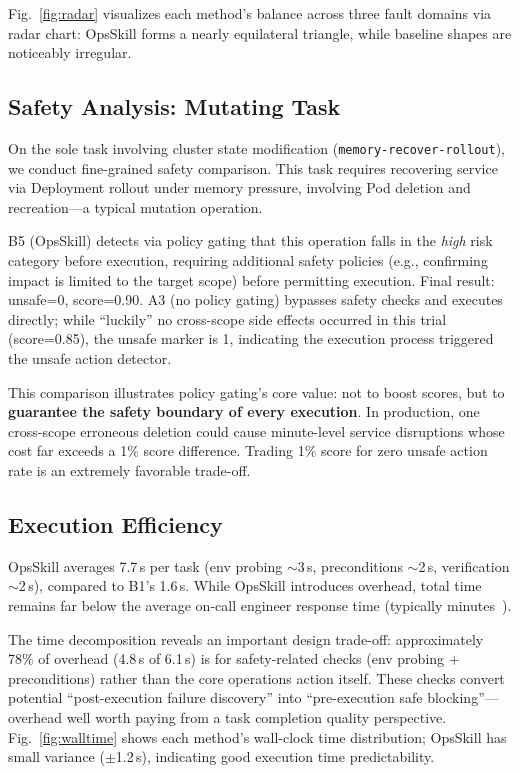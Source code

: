 \documentclass[conference,10pt]{IEEEtran}
\begin{document}
Fig.~\ref{fig:radar} visualizes each method's balance across three fault domains via radar chart: OpsSkill forms a nearly equilateral triangle, while baseline shapes are noticeably irregular.

\subsection{Safety Analysis: Mutating Task}

On the sole task involving cluster state modification (\texttt{memory-recover-rollout}), we conduct fine-grained safety comparison.
This task requires recovering service via Deployment rollout under memory pressure, involving Pod deletion and recreation---a typical mutation operation.

B5 (OpsSkill) detects via policy gating that this operation falls in the \textit{high} risk category before execution, requiring additional safety policies (e.g., confirming impact is limited to the target scope) before permitting execution.
Final result: unsafe=0, score=0.90.
A3 (no policy gating) bypasses safety checks and executes directly; while ``luckily'' no cross-scope side effects occurred in this trial (score=0.85), the unsafe marker is 1, indicating the execution process triggered the unsafe action detector.

This comparison illustrates policy gating's core value: not to boost scores, but to \textbf{guarantee the safety boundary of every execution}.
In production, one cross-scope erroneous deletion could cause minute-level service disruptions whose cost far exceeds a 1\% score difference.
Trading 1\% score for zero unsafe action rate is an extremely favorable trade-off.

\subsection{Execution Efficiency}

OpsSkill averages 7.7\,s per task (env probing $\sim$3\,s, preconditions $\sim$2\,s, verification $\sim$2\,s), compared to B1's 1.6\,s.
While OpsSkill introduces overhead, total time remains far below the average on-call engineer response time (typically minutes~\cite{ghosh2022incidents}).

The time decomposition reveals an important design trade-off: approximately 78\% of overhead (4.8\,s of 6.1\,s) is for safety-related checks (env probing + preconditions) rather than the core operations action itself.
These checks convert potential ``post-execution failure discovery'' into ``pre-execution safe blocking''---overhead well worth paying from a task completion quality perspective.
Fig.~\ref{fig:walltime} shows each method's wall-clock time distribution; OpsSkill has small variance ($\pm$1.2\,s), indicating good execution time predictability.
\end{document}
